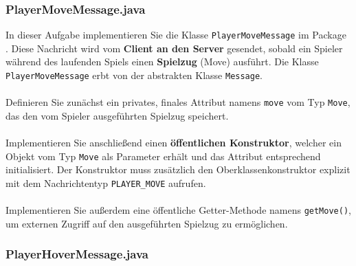 \documentclass[12pt]{article}
\begin{document}
\subsubsection*{PlayerMoveMessage.java}

In dieser Aufgabe implementieren Sie die Klasse \texttt{PlayerMoveMessage} im Package . 
Diese Nachricht wird vom \textbf{Client an den Server} gesendet, sobald ein Spieler während des laufenden Spiels einen \textbf{Spielzug} (Move) ausführt. 
Die Klasse \texttt{PlayerMoveMessage} erbt von der abstrakten Klasse \texttt{Message}.
\\ \\
Definieren Sie zunächst ein privates, finales Attribut namens \texttt{move} vom Typ \texttt{Move}, 
das den vom Spieler ausgeführten Spielzug speichert.
\\ \\
Implementieren Sie anschließend einen \textbf{öffentlichen Konstruktor}, 
welcher ein Objekt vom Typ \texttt{Move} als Parameter erhält und das Attribut entsprechend initialisiert. 
Der Konstruktor muss zusätzlich den Oberklassenkonstruktor explizit mit dem Nachrichtentyp \texttt{PLAYER\_MOVE} aufrufen.
\\ \\
Implementieren Sie außerdem eine öffentliche Getter-Methode namens \texttt{getMove()}, 
um externen Zugriff auf den ausgeführten Spielzug zu ermöglichen.

\subsubsection*{PlayerHoverMessage.java}
\end{document}
